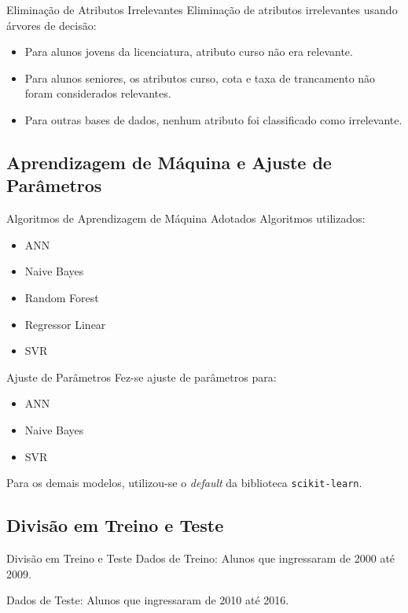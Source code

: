 \begin{frame}{Eliminação de Atributos Irrelevantes}
    Eliminação de atributos irrelevantes usando árvores de decisão: 
    \begin{itemize}
        \item Para alunos jovens da licenciatura, atributo curso não era relevante. 
        \item Para alunos seniores, os atributos curso, cota e taxa de trancamento
            não foram considerados relevantes. 
        \item Para outras bases de dados, nenhum atributo foi classificado como
            irrelevante. 
    \end{itemize}
\end{frame}

\subsection{Aprendizagem de Máquina e Ajuste de Parâmetros}
\begin{frame}{Algoritmos de Aprendizagem de Máquina Adotados}
    Algoritmos utilizados: 
    \begin{itemize}
        \item ANN
        \item Naive Bayes
        \item Random Forest
        \item Regressor Linear 
        \item SVR
    \end{itemize}
\end{frame}

\begin{frame}{Ajuste de Parâmetros}
    Fez-se ajuste de parâmetros para:
    \begin{itemize}
        \item ANN
        \item Naive Bayes
        \item SVR
    \end{itemize}

    \vspace{0.5cm}

    Para os demais modelos, utilizou-se o \textit{default} da biblioteca
    \texttt{scikit-learn}.
\end{frame}

\subsection{Divisão em Treino e Teste}
\begin{frame}{Divisão em Treino e Teste}
    Dados de Treino: Alunos que ingressaram de 2000 até 2009.

    \vspace{0.5cm}

    Dados de Teste: Alunos que ingressaram de 2010 até 2016.
\end{frame}

